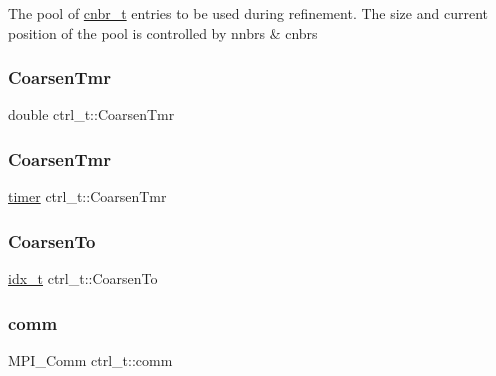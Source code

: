 The pool of \hyperlink{a00714}{cnbr\+\_\+t} entries to be used during refinement. The size and current position of the pool is controlled by nnbrs \& cnbrs \mbox{\label{a00742_a0a761fa32d40dad05f3f010480221577}} 
\subsubsection{\texorpdfstring{Coarsen\+Tmr}{CoarsenTmr}\hspace{0.1cm}{\footnotesize\ttfamily [1/2]}}
{\footnotesize\ttfamily double ctrl\+\_\+t\+::\+Coarsen\+Tmr}

\mbox{\label{a00742_a108d417b55d602e138bdb44b8d80f245}} 
\subsubsection{\texorpdfstring{Coarsen\+Tmr}{CoarsenTmr}\hspace{0.1cm}{\footnotesize\ttfamily [2/2]}}
{\footnotesize\ttfamily \hyperlink{a00978_aae821c36bb7e6918e1414484f939c3d4}{timer} ctrl\+\_\+t\+::\+Coarsen\+Tmr}

\mbox{\label{a00742_a5f4e7c5bbef13001912e0bb3a161862e}} 
\subsubsection{\texorpdfstring{Coarsen\+To}{CoarsenTo}}
{\footnotesize\ttfamily \hyperlink{a00876_aaa5262be3e700770163401acb0150f52}{idx\+\_\+t} ctrl\+\_\+t\+::\+Coarsen\+To}

\mbox{\label{a00742_a5ecd63179c45d9dfac0ed80074ac3ab8}} 
\subsubsection{\texorpdfstring{comm}{comm}}
{\footnotesize\ttfamily M\+P\+I\+\_\+\+Comm ctrl\+\_\+t\+::comm}

